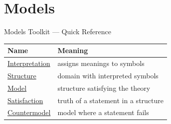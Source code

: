 \section{Models}

\begin{toolkitbox}{Models Toolkit --- Quick Reference}
\small
\begin{tabular}{l l}
\toprule
\textbf{Name}  & \textbf{Meaning} \\
\midrule
\hyperref[def:axiom-systems-interpretation]{Interpretation}  & assigns meanings to symbols \\
\hyperref[def:axiom-systems-structure]{Structure}  & domain with interpreted symbols \\
\hyperref[def:axiom-systems-model]{Model}  & structure satisfying the theory \\
\hyperref[def:axiom-systems-satisfaction]{Satisfaction}  & truth of a statement in a structure \\
\hyperref[def:axiom-systems-countermodel]{Countermodel}  & model where a statement fails \\
\bottomrule
\end{tabular}
\end{toolkitbox}




